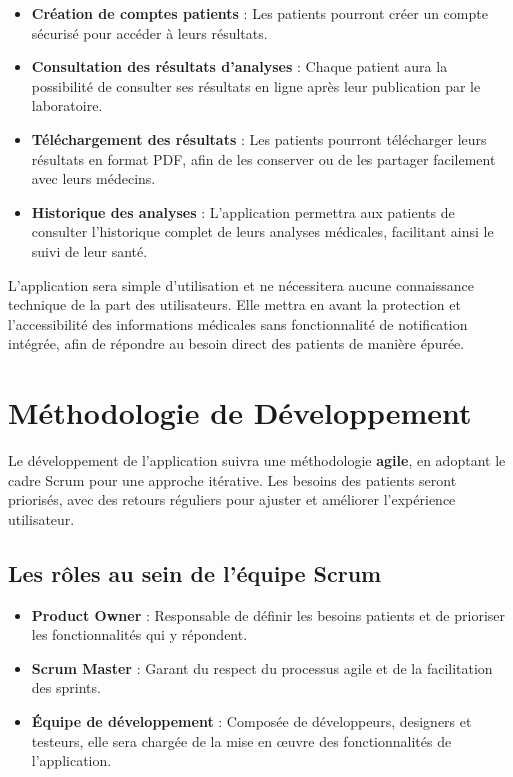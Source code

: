 \documentclass[12pt,a4paper]{report}
\begin{document}
\begin{itemize}
    \item \textbf{Création de comptes patients} : Les patients pourront créer un compte sécurisé pour accéder à leurs résultats.
    \item \textbf{Consultation des résultats d'analyses} : Chaque patient aura la possibilité de consulter ses résultats en ligne après leur publication par le laboratoire.
    \item \textbf{Téléchargement des résultats} : Les patients pourront télécharger leurs résultats en format PDF, afin de les conserver ou de les partager facilement avec leurs médecins.
    \item \textbf{Historique des analyses} : L'application permettra aux patients de consulter l'historique complet de leurs analyses médicales, facilitant ainsi le suivi de leur santé.
\end{itemize}

L'application sera simple d'utilisation et ne nécessitera aucune connaissance technique de la part des utilisateurs. Elle mettra en avant la protection et l'accessibilité des informations médicales sans fonctionnalité de notification intégrée, afin de répondre au besoin direct des patients de manière épurée.

\section{Méthodologie de Développement}
Le développement de l'application suivra une méthodologie \textbf{agile}, en adoptant le cadre Scrum pour une approche itérative. Les besoins des patients seront priorisés, avec des retours réguliers pour ajuster et améliorer l'expérience utilisateur.

\subsection{Les rôles au sein de l'équipe Scrum}
\begin{itemize}
    \item \textbf{Product Owner} : Responsable de définir les besoins patients et de prioriser les fonctionnalités qui y répondent.
    \item \textbf{Scrum Master} : Garant du respect du processus agile et de la facilitation des sprints.
    \item \textbf{Équipe de développement} : Composée de développeurs, designers et testeurs, elle sera chargée de la mise en œuvre des fonctionnalités de l'application.
\end{itemize}
\end{document}
